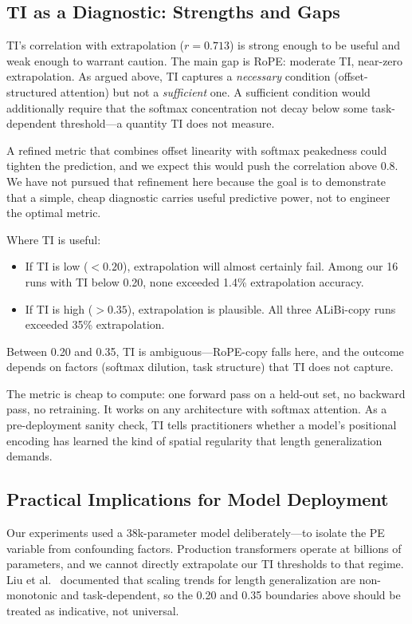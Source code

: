 \documentclass[10pt,twocolumn]{article}
\begin{document}
\subsection{TI as a Diagnostic: Strengths and Gaps}

TI's correlation with extrapolation ($r = 0.713$) is strong enough to be useful and weak enough to warrant caution.
The main gap is RoPE: moderate TI, near-zero extrapolation.
As argued above, TI captures a \emph{necessary} condition (offset-structured attention) but not a \emph{sufficient} one.
A sufficient condition would additionally require that the softmax concentration not decay below some task-dependent threshold---a quantity TI does not measure.

A refined metric that combines offset linearity with softmax peakedness could tighten the prediction, and we expect this would push the correlation above 0.8.
We have not pursued that refinement here because the goal is to demonstrate that a simple, cheap diagnostic carries useful predictive power, not to engineer the optimal metric.

Where TI is useful:
\begin{itemize}
  \item If TI is low ($< 0.20$), extrapolation will almost certainly fail. Among our 16 runs with TI below 0.20, none exceeded 1.4\% extrapolation accuracy.
  \item If TI is high ($> 0.35$), extrapolation is plausible. All three ALiBi-copy runs exceeded 35\% extrapolation.
\end{itemize}
Between 0.20 and 0.35, TI is ambiguous---RoPE-copy falls here, and the outcome depends on factors (softmax dilution, task structure) that TI does not capture.

The metric is cheap to compute: one forward pass on a held-out set, no backward pass, no retraining.
It works on any architecture with softmax attention.
As a pre-deployment sanity check, TI tells practitioners whether a model's positional encoding has learned the kind of spatial regularity that length generalization demands.

\subsection{Practical Implications for Model Deployment}

Our experiments used a 38k-parameter model deliberately---to isolate the PE variable from confounding factors.
Production transformers operate at billions of parameters, and we cannot directly extrapolate our TI thresholds to that regime.
Liu et al.~\cite{liu2024scaling} documented that scaling trends for length generalization are non-monotonic and task-dependent, so the 0.20 and 0.35 boundaries above should be treated as indicative, not universal.
\end{document}
